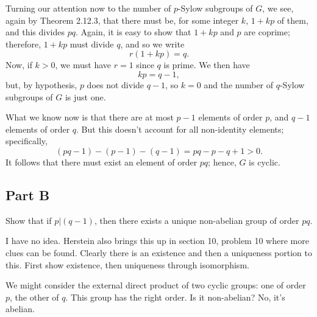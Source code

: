 \documentclass[12pt]{article}
\begin{document}
Turning our attention now to the number of $p$-Sylow subgroups of $G$, we see, again by
Theorem 2.12.3, that there must be, for some integer $k$, $1+kp$ of them, and this divides $pq$.
Again, it is easy to show that $1+kp$ and $p$ are coprime; therefore, $1+kp$ must divide $q$,
and so we write
\begin{equation*}
r(1+kp)=q.
\end{equation*}
Now, if $k>0$, we must have $r=1$ since $q$ is prime.  We then have
\begin{equation*}
kp = q - 1,
\end{equation*}
but, by hypothesis, $p$ does not divide $q-1$, so $k=0$ and the number of $q$-Sylow
subgroups of $G$ is just one.

What we know now is that there are at most $p-1$ elements of order $p$,
and $q-1$ elements of order $q$.  But this doesn't account for all non-identity elements; specifically,
\begin{equation*}
(pq-1)-(p-1)-(q-1)=pq-p-q+1>0.
\end{equation*}
It follows that there must exist an element of order $pq$; hence, $G$ is cyclic.

\subsection*{Part B}

Show that if $p|(q-1)$, then there exists a unique non-abelian group of order $pq$.

I have no idea.  Herstein also brings this up in section 10, problem 10 where more clues can be found.
Clearly there is an existence and then a uniqueness portion to this.  First show existence, then
uniqueness through isomorphism.

We might consider the external direct product of two cyclic groups: one of order $p$, the
other of $q$.  This group has the right order.  Is it non-abelian?  No, it's abelian.
\end{document}
